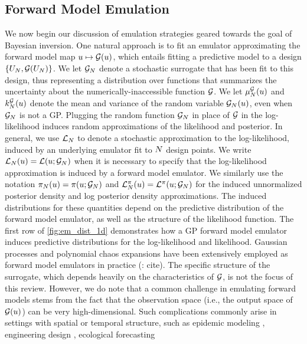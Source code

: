 \documentclass[12pt]{article}
\begin{document}
\subsection{Forward Model Emulation}
We now begin our discussion of emulation strategies geared towards the goal of Bayesian inversion.
One natural approach is to fit an emulator approximating the forward model map $\Par \mapsto \fwd(\Par)$,
which entails fitting a predictive model to a design $\{\designIn, \fwd(\designIn)\}$. 
We let $\fwdEm[\Ndesign]$ denote a stochastic surrogate that has been fit to this design,
thus representing a distribution over functions that summarizes the uncertainty about the 
numerically-inaccessible function $\fwd$. We let $\emMean[\Ndesign]{\fwd}(\Par)$ and 
$\emKer[\Ndesign]{\fwd}(\Par)$ denote the mean and variance of the random 
variable $\fwdEm[\Ndesign](\Par)$, even when $\fwdEm[\Ndesign]$ is not a GP.
Plugging the random function $\fwdEm[\Ndesign]$ in place of $\fwd$ in the log-likelihood 
induces random approximations of the likelihood and posterior. In general, we use 
$\llikEm[\Ndesign]$ to denote a stochastic approximation to the log-likelihood, induced
by an underlying emulator fit to $\Ndesign$ design points. We write 
$\llikEm[\Ndesign](\Par) = \llik(\Par; \fwdEm[\Ndesign])$ when it is necessary to specify that
the log-likelihood approximation is induced by a forward model emulator. We similarly use 
the notation $\postEm(\Par) = \postDens(\Par; \fwdEm[\Ndesign])$ and 
$\lpostEm(\Par) = \lpost(\Par; \fwdEm[\Ndesign])$ for the induced unnormalized 
posterior density and log posterior density approximations. The induced distributions for 
these quantities depend on the predictive distribution of the forward model emulator, as
well as the structure of the likelihood function. The first row of \cref{fig:em_dist_1d} 
demonstrates how a GP forward model emulator induces predictive distributions 
for the log-likelihood and likelihood. Gaussian processes and polynomial 
chaos expansions have been extensively employed as forward model emulators in 
practice (\todo: cite). The specific structure of the surrogate, which depends heavily on the 
characteristics of $\fwd$, is not the focus of this review. However, we do note that 
a common challenge in emulating forward models stems from the fact that the observation 
space (i.e., the output space of $\fwd(\Par)$) can be very high-dimensional. 
Such complications commonly arise in settings with spatial or temporal structure, 
such as epidemic modeling \citep{FadikarAgentBased},
engineering design \citep{PODemulation}, ecological forecasting 
\end{document}
